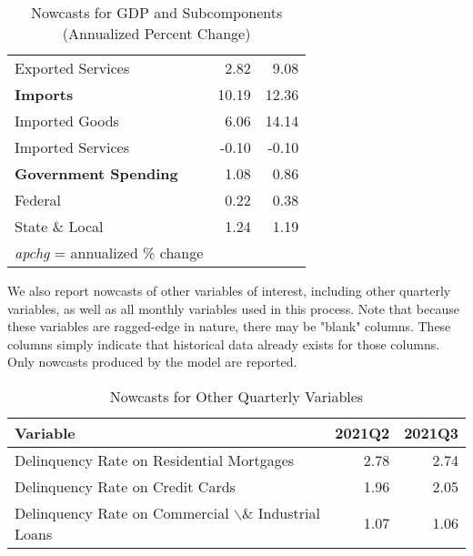 \documentclass[11pt, letterpaper]{article}\usepackage[]{graphicx}\usepackage[]{color}
\begin{document}
\begin{table}[H]
\begin{tabular}{lrr}
  \hspace{8mm}  Exported Services & 2.82 & 9.08 \\ 
  \hspace{0mm} \textbf{Imports} & 10.19 & 12.36 \\ 
  \hspace{8mm}  Imported Goods & 6.06 & 14.14 \\ 
  \hspace{8mm}  Imported Services & -0.10 & -0.10 \\ 
  \hspace{0mm} \textbf{Government Spending} & 1.08 & 0.86 \\ 
  \hspace{8mm}  Federal & 0.22 & 0.38 \\ 
  \hspace{8mm}  State \& Local & 1.24 & 1.19 \\ 
   \hline 
 \textit{apchg} = annualized \% change 
\end{tabular}
\endgroup
\caption{Nowcasts for GDP and Subcomponents (Annualized Percent Change)} 
\end{table}


We also report nowcasts of other variables of interest, including other quarterly variables, as well as all monthly variables used in this process. Note that because these variables are ragged-edge in nature, there may be "blank" columns. These columns simply indicate that historical data already exists for those columns. Only nowcasts produced by the model are reported.
\begin{table}[H]
\centering
\begingroup\fontsize{11pt}{13pt}\selectfont
\begin{tabular}{lrr}
  \hline
Variable & 2021Q2 & 2021Q3 \\ 
  \hline
Delinquency Rate on Residential Mortgages & 2.78 & 2.74 \\ 
  Delinquency Rate on Credit Cards & 1.96 & 2.05 \\ 
  Delinquency Rate on Commercial $\backslash$\& Industrial Loans & 1.07 & 1.06 \\ 
   \hline
\end{tabular}
\endgroup
\caption{Nowcasts for Other Quarterly Variables} 
\end{table}
\end{document}
